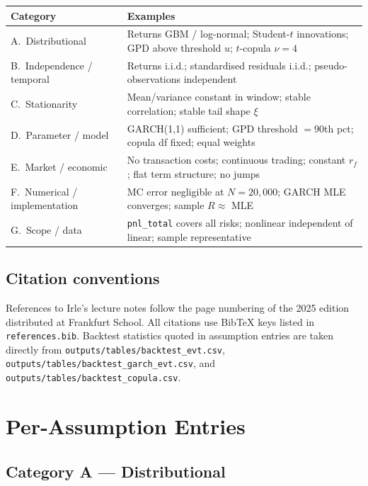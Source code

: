 \documentclass[11pt,a4paper]{article}
\newcommand{\code}[1]{\texttt{#1}}
\begin{document}
\medskip
\begin{tabular}{@{}p{4cm}p{10.5cm}@{}}
\toprule
\textbf{Category} & \textbf{Examples} \\
\midrule
A.\ Distributional & Returns GBM / log-normal; Student-$t$ innovations;
  GPD above threshold $u$; $t$-copula $\nu=4$ \\[4pt]
B.\ Independence / temporal & Returns i.i.d.; standardised residuals i.i.d.;
  pseudo-observations independent \\[4pt]
C.\ Stationarity & Mean/variance constant in window; stable correlation;
  stable tail shape $\xi$ \\[4pt]
D.\ Parameter / model & GARCH(1,1) sufficient; GPD threshold $= 90$th pct;
  copula df fixed; equal weights \\[4pt]
E.\ Market / economic & No transaction costs; continuous trading; constant
  $r_f$; flat term structure; no jumps \\[4pt]
F.\ Numerical / implementation & MC error negligible at $N{=}20{,}000$;
  GARCH MLE converges; sample $R \approx$ MLE \\[4pt]
G.\ Scope / data & \code{pnl\_total} covers all risks; nonlinear
  independent of linear; sample representative \\
\bottomrule
\end{tabular}

\subsection{Citation conventions}\label{sec:citations}

References to Irle's lecture notes follow the page numbering of the
2025 edition distributed at Frankfurt School. All citations use
BibTeX keys listed in \code{references.bib}. Backtest statistics
quoted in assumption entries are taken directly from
\code{outputs/tables/backtest\_evt.csv},
\code{outputs/tables/backtest\_garch\_evt.csv}, and
\code{outputs/tables/backtest\_copula.csv}.

\section{Per-Assumption Entries}\label{sec:entries}

\subsection{Category A --- Distributional}\label{sec:catA}
\end{document}
